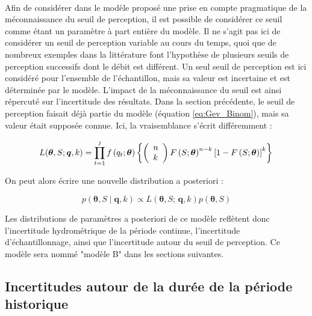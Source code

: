 \documentclass[11pt]{article}
\begin{document}
		\paragraph{}
		Afin de considérer dans le modèle proposé une prise en compte pragmatique de la méconnaissance du seuil de perception, il est possible de considérer ce seuil comme étant un paramètre à part entière du modèle. Il ne s'agit pas ici de considérer un seuil de perception variable au cours du temps, quoi que de nombreux exemples dans la littérature font l'hypothèse de plusieurs seuils de perception successifs dont le débit est différent. Un seul seuil de perception est ici considéré pour l'ensemble de l'échantillon, mais sa valeur est incertaine et est déterminée par le modèle. L'impact de la méconnaissance du seuil est ainsi répercuté sur l'incertitude des résultats. Dans la section précédente, le seuil de perception faisait déjà partie du modèle (équation \ref{eq:Gev_Binom}), mais sa valeur était supposée connue. Ici, la vraisemblance s'écrit différemment : 
		
				\begin{equation}
				L(\boldsymbol{\theta}, S ; \boldsymbol{q}, k) =\prod_{t=1}^j f\left(q_t;\boldsymbol{\theta}\right) \left\{\left(\begin{array}{l}
				n \\
				k
				\end{array}\right) F\left(S;\boldsymbol{\theta}\right)^{n-k}\left[1-F\left(S;\boldsymbol{\theta}\right)\right]^k\right\} \\
				\label{eq:Gev_Binom_uS}
				\end{equation}
				
		On peut alors écrire une nouvelle distribution a posteriori : 			
				
				\begin{equation}
					p(\boldsymbol{\theta}, S \mid \boldsymbol{q},k) \propto L(\boldsymbol{\theta},S;\,\boldsymbol{q},k) p(\boldsymbol{\theta},S)
					\label{eq:Bayes_uS}
				\end{equation}
			
		Les distributions de paramètres a posteriori de ce modèle reflètent donc l'incertitude hydrométrique de la période continue, l'incertitude d'échantillonnage, ainsi que l'incertitude autour du seuil de perception. Ce modèle sera nommé "modèle B" dans les sections suivantes.
		

	\subsection{Incertitudes autour de la durée de la période historique}
	
\end{document}
